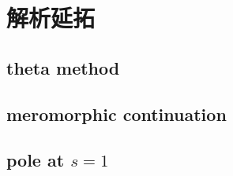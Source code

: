 \section{解析延拓}
\label{b3:sec:2603}



\subsection{theta method}
\label{b3:subsec:260302}

\subsection{meromorphic continuation}
\label{b3:subsec:260303}

\subsection{pole at \texorpdfstring{\(s=1\)}{s=1}}
\label{b3:subsec:260304}


